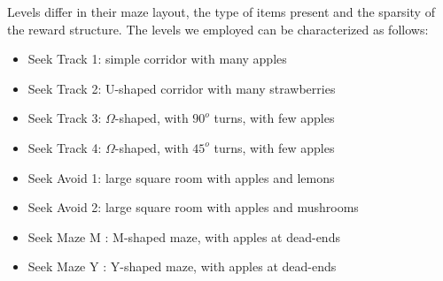 \documentclass{article}
\begin{document}
Levels differ in their maze layout, the type of items present and the sparsity
of the reward structure. The levels we employed can be characterized as follows:
\begin{itemize}
\item Seek Track 1: simple corridor with many apples
\item Seek Track 2: U-shaped corridor with many strawberries
\item Seek Track 3: $\Omega$-shaped, with $90^o$ turns, with few apples
\item Seek Track 4: $\Omega$-shaped, with $45^o$ turns, with few apples
\item Seek Avoid 1: large square room with apples and lemons
\item Seek Avoid 2: large square room with apples and mushrooms
\item Seek Maze M : M-shaped maze, with apples at dead-ends
\item Seek Maze Y : Y-shaped maze, with apples at dead-ends
\end{itemize}

\end{document}
